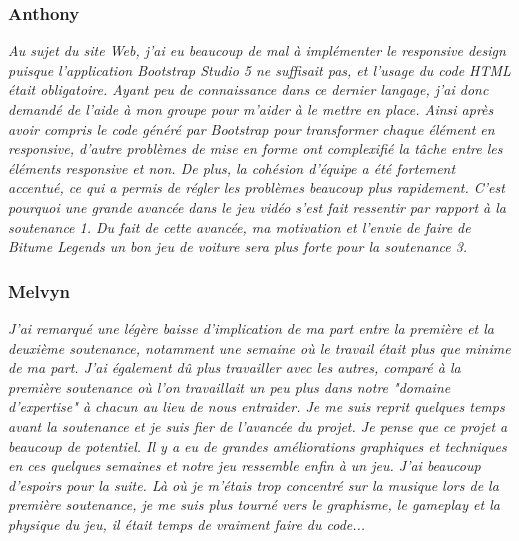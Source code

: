 \documentclass[12pt,a4paper]{article}
\begin{document}
            \subsubsection{Anthony}
                \textit{Au sujet du site Web, j'ai eu beaucoup de mal à implémenter le responsive design
                puisque l'application Bootstrap Studio 5 ne suffisait pas, et l'usage du code HTML était
                obligatoire. Ayant peu de connaissance dans ce dernier langage, j'ai donc demandé
                de l'aide à mon groupe pour m'aider à le mettre en place. Ainsi après avoir compris le
                code généré par Bootstrap pour transformer chaque élément en responsive, d'autre
                problèmes de mise en forme ont complexifié la tâche entre les éléments responsive et
                non. De plus, la cohésion d'équipe a été fortement accentué, ce qui a permis de régler 
                les problèmes beaucoup plus rapidement. C'est pourquoi une grande avancée dans le 
                jeu vidéo s'est fait ressentir par rapport à la soutenance 1. Du fait de cette avancée, 
                ma motivation et l'envie de faire de Bitume Legends un bon jeu de voiture sera plus 
                forte pour la soutenance 3.}

            \subsubsection{Melvyn}
                \textit{J'ai remarqué une légère baisse d'implication de ma part entre la 
                première et la deuxième soutenance, notamment une semaine où le 
                travail était plus que minime de ma part. J'ai également dû plus 
                travailler avec les autres, comparé à la première soutenance où l'on
                travaillait un peu plus dans notre "domaine d'expertise" à chacun 
                au lieu de nous entraider. Je me suis reprit quelques temps avant la
                soutenance et je suis fier de l'avancée du projet. Je pense que ce projet
                a beaucoup de potentiel. Il y a eu de grandes améliorations graphiques et
                techniques en ces quelques semaines et notre jeu ressemble enfin à un jeu.
                J'ai beaucoup d'espoirs pour la suite. Là où je m'étais trop concentré sur
                la musique lors de la première soutenance, je me suis plus tourné vers
                le graphisme, le \textsl{gameplay} et la physique du jeu, il était temps de vraiment
                faire du code...}
\end{document}
